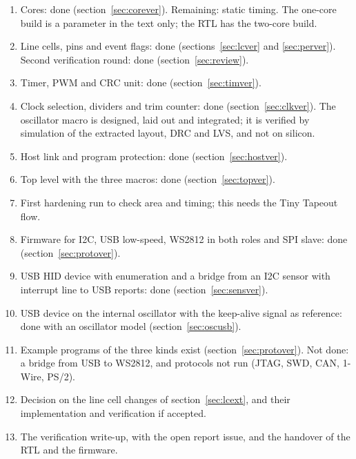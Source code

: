 \documentclass[10pt,a4paper]{article}
\begin{document}
\begin{enumerate}
\item Cores: done (section~\ref{sec:corever}). Remaining: static timing. The one-core build is a parameter in the text only; the RTL has the two-core build.
\item Line cells, pins and event flags: done (sections~\ref{sec:lcver} and \ref{sec:perver}). Second verification round: done (section~\ref{sec:review}).
\item Timer, PWM and CRC unit: done (section~\ref{sec:timver}).
\item Clock selection, dividers and trim counter: done (section~\ref{sec:clkver}). The oscillator macro is designed, laid out and integrated; it is verified by simulation of the extracted layout, DRC and LVS, and not on silicon.
\item Host link and program protection: done (section~\ref{sec:hostver}).
\item Top level with the three macros: done (section~\ref{sec:topver}).
\item First hardening run to check area and timing; this needs the Tiny Tapeout flow.
\item Firmware for I2C, USB low-speed, WS2812 in both roles and SPI slave: done (section~\ref{sec:protover}).
\item USB HID device with enumeration and a bridge from an I2C sensor with interrupt line to USB reports: done (section~\ref{sec:sensver}).
\item USB device on the internal oscillator with the keep-alive signal as reference: done with an oscillator model (section~\ref{sec:oscusb}).
\item Example programs of the three kinds exist (section~\ref{sec:protover}). Not done: a bridge from USB to WS2812, and protocols not run (JTAG, SWD, CAN, 1-Wire, PS/2).
\item Decision on the line cell changes of section~\ref{sec:lcext}, and their implementation and verification if accepted.
\item The verification write-up, with the open report issue, and the handover of the RTL and the firmware.
\end{enumerate}
\end{document}
